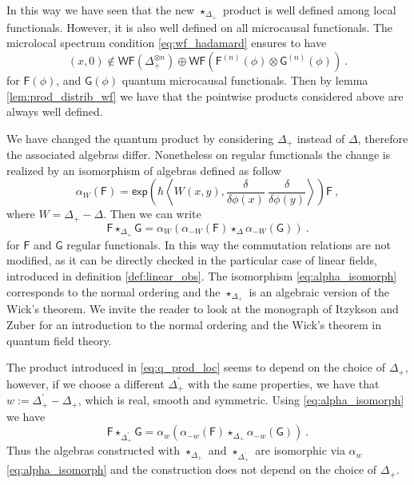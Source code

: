 \documentclass[11pt]{book}
\newcommand{\WF}{\mathsf{WF}}
\renewcommand{\exp}{\mathsf{exp}}
\newcommand{\sm}[1]{\left\langle#1\right\rangle}
\newcommand{\Fsf}{\mathsf{F}}
\newcommand{\Gsf}{\mathsf{G}}
\theoremstyle{break}
\begin{document}
In this way we have seen that the new $\star_{\Delta_+}$ product is well defined among local functionals. However, it is also well defined on all microcausal functionals. The microlocal spectrum condition \eqref{eq:wf_hadamard} ensures to have
%
\begin{equation*}
(x,0) \notin \WF(\Delta_+^{\otimes n}) \oplus \WF\left(\Fsf^{(n)}(\phi) \otimes \Gsf^{(n)}(\phi)\right) \ .
\end{equation*}
%
for $\Fsf(\phi)$, and $\Gsf(\phi)$ quantum microcausal functionals. Then by lemma \ref{lem:prod_distrib_wf} we have that the pointwise products considered above are always well defined.


\bigskip


We have changed the quantum product by considering $\Delta_+$ instead of $\Delta$, therefore the associated algebras differ. Nonetheless on regular functionals the change is realized by an isomorphism of algebras defined as follow
%
\begin{equation}
\alpha_{W}(\Fsf) = \exp\left(\hbar \sm{ W(x,y) , \frac{\delta}{\delta\phi(x)} \ \frac{\delta}{\delta\phi(y)} } \right) \Fsf \ ,
\label{eq:alpha_isomorph} 
\end{equation}
%
where $W = \Delta_+ - \Delta$. Then we can write
%
\begin{equation*}
\Fsf \star_{\Delta_+} \Gsf = \alpha_W \left(\alpha_{-W}(\Fsf) \star_{\Delta} \alpha_{-W}(\Gsf)\right) \ .
\end{equation*}
%
for $\Fsf$ and $\Gsf$ regular functionals. In this way the commutation relations are not modified, as it can be directly checked in the particular case of linear fields, introduced in definition \ref{def:linear_obs}. The isomorphism \eqref{eq:alpha_isomorph} corresponds to the normal ordering and the $\star_{\Delta_+}$ is an algebraic version of the Wick's theorem. We invite the reader to look at the monograph of Itzykson and Zuber \cite{itzykson_quantum_1980} for an introduction to the normal ordering and the Wick's theorem in quantum field theory. 


\bigskip


The product introduced in \eqref{eq:q_prod_loc} seems to depend on the choice of $\Delta_+$, however, if we choose a different $\Delta^\prime_+$ with the same properties, we have that $w:=\Delta^\prime_+ - \Delta_+$, which is real, smooth and symmetric. Using \eqref{eq:alpha_isomorph} we have
%
\begin{equation}
\Fsf \star_{\Delta^\prime_+} \Gsf = \alpha_w \left(\alpha_{-w}(\Fsf) \star_{\Delta_+} \alpha_{-w}(\Gsf)\right) \ .
\end{equation}
%
Thus the algebras constructed with $\star_{\Delta_+}$ and $\star_{\Delta^\prime_+}$ are isomorphic via $\alpha_{w}$ \eqref{eq:alpha_isomorph} and the construction does not depend on the choice of $\Delta_+$.
\end{document}
